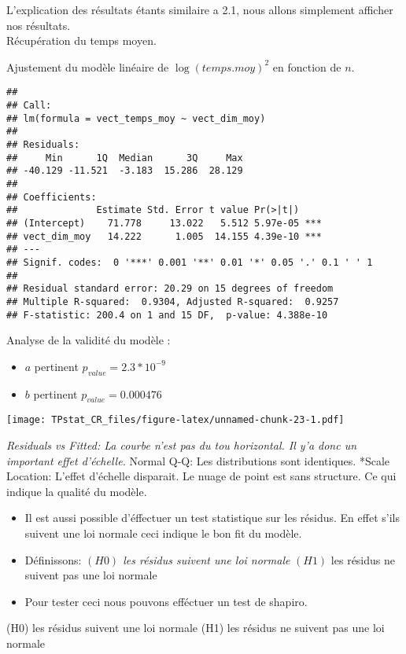 \documentclass[
]{article}
\providecommand{\tightlist}{%
  \setlength{\itemsep}{0pt}\setlength{\parskip}{0pt}}
\begin{document}
L'explication des résultats étants similaire a 2.1, nous allons
simplement afficher nos résultats.\\
Récupération du temps moyen.

Ajustement du modèle linéaire de \(\log(temps.moy)^2\) en fonction de
\(n\).

\begin{verbatim}
## 
## Call:
## lm(formula = vect_temps_moy ~ vect_dim_moy)
## 
## Residuals:
##     Min      1Q  Median      3Q     Max 
## -40.129 -11.521  -3.183  15.286  28.129 
## 
## Coefficients:
##              Estimate Std. Error t value Pr(>|t|)    
## (Intercept)    71.778     13.022   5.512 5.97e-05 ***
## vect_dim_moy   14.222      1.005  14.155 4.39e-10 ***
## ---
## Signif. codes:  0 '***' 0.001 '**' 0.01 '*' 0.05 '.' 0.1 ' ' 1
## 
## Residual standard error: 20.29 on 15 degrees of freedom
## Multiple R-squared:  0.9304, Adjusted R-squared:  0.9257 
## F-statistic: 200.4 on 1 and 15 DF,  p-value: 4.388e-10
\end{verbatim}

Analyse de la validité du modèle :

\begin{itemize}
\tightlist
\item
  \(a\) pertinent \(p_{value} = 2.3*10^{-9}\)
\item
  \(b\) pertinent \(p_{value} = 0.000476\)
\end{itemize}

\texttt{[image: TPstat\_CR\_files/figure-latex/unnamed-chunk-23-1.pdf]}

\emph{Residuals vs Fitted: La courbe n'est pas du tou horizontal. Il y'a
donc un important effet d'échelle. } Normal Q-Q: Les distributions sont
identiques. *Scale Location: L'effet d'échelle disparait. Le nuage de
point est sans structure. Ce qui indique la qualité du modèle.

\begin{itemize}
\tightlist
\item
  Il est aussi possible d'éffectuer un test statistique sur les résidus.
  En effet s'ils suivent une loi normale ceci indique le bon fit du
  modèle.
\item
  Définissons: \emph{\((H0)\) les résidus suivent une loi normale
  }\((H1)\) les résidus ne suivent pas une loi normale
\item
  Pour tester ceci nous pouvons efféctuer un test de shapiro.
\end{itemize}

(H0) les résidus suivent une loi normale (H1) les résidus ne suivent pas
une loi normale
\end{document}
